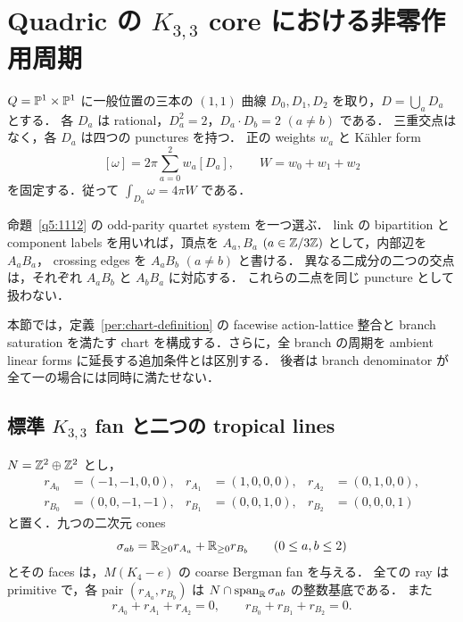 \section{Quadric の \texorpdfstring{$K_{3,3}$}{K3,3} core における非零作用周期}
\label{quad:section}

$Q=\mathbb P^1\times\mathbb P^1$ に一般位置の三本の $(1,1)$ 曲線
$D_0,D_1,D_2$ を取り，$D=\bigcup_aD_a$ とする．
各 $D_a$ は rational，$D_a^2=2$，$D_a\cdot D_b=2$ $(a\ne b)$ である．
三重交点はなく，各 $D_a$ は四つの punctures を持つ．
正の weights $w_a$ と Kähler form
\begin{equation}\label{quad:class}
 [\omega]=2\pi\sum_{a=0}^2w_a[D_a],\qquad W=w_0+w_1+w_2
\end{equation}
を固定する．従って $\int_{D_a}\omega=4\pi W$ である．

命題~\ref{q5:1112} の odd-parity quartet system を一つ選ぶ．
link の bipartition と component labels を用いれば，頂点を
$A_a,B_a$ $(a\in\mathbb Z/3\mathbb Z)$ として，内部辺を $A_aB_a$，
crossing edges を $A_aB_b$ $(a\ne b)$ と書ける．
異なる二成分の二つの交点は，それぞれ $A_aB_b$ と $A_bB_a$ に対応する．
これらの二点を同じ puncture として扱わない．

本節では，定義~\ref{per:chart-definition} の facewise action-lattice 整合と
branch saturation を満たす chart を構成する．さらに，全 branch の周期を
ambient linear forms に延長する追加条件とは区別する．
後者は branch denominator が全て一の場合には同時に満たせない．

\subsection{標準 \texorpdfstring{$K_{3,3}$}{K3,3} fan と二つの tropical lines}

\begin{lemma}\label{quad:fan}
$N=\mathbb Z^2\oplus\mathbb Z^2$ とし，
\begin{align*}
 r_{A_0}&=(-1,-1,0,0),&r_{A_1}&=(1,0,0,0),&r_{A_2}&=(0,1,0,0),\\
 r_{B_0}&=(0,0,-1,-1),&r_{B_1}&=(0,0,1,0),&r_{B_2}&=(0,0,0,1)
\end{align*}
と置く．九つの二次元 cones
\[
 \sigma_{ab}=\mathbb R_{\geq0}r_{A_a}+\mathbb R_{\geq0}r_{B_b}
 \qquad(0\leq a,b\leq2)
\]
とその faces は，$M(K_4-e)$ の coarse Bergman fan を与える．
全ての ray は primitive で，各 pair $(r_{A_a},r_{B_b})$ は
$N\cap\operatorname{span}_\mathbb R\sigma_{ab}$ の整数基底である．
また
\begin{equation}\label{quad:fan-relations}
 r_{A_0}+r_{A_1}+r_{A_2}=0,
 \qquad r_{B_0}+r_{B_1}+r_{B_2}=0.
\end{equation}
\end{lemma}


